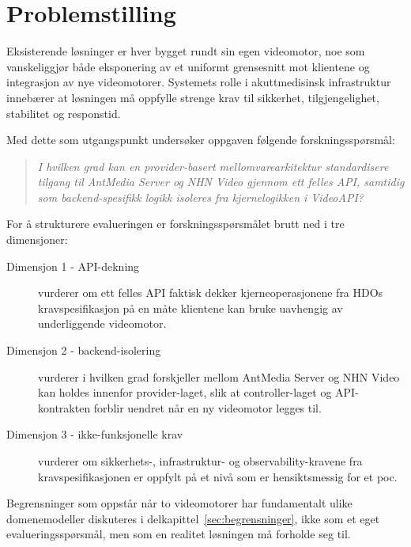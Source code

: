 \section{Problemstilling}
\label{sec:problemstilling}
Eksisterende løsninger er hver bygget rundt sin egen videomotor, noe som vanskeliggjør både eksponering av et uniformt grensesnitt mot klientene og integrasjon av nye videomotorer. Systemets rolle i akuttmedisinsk infrastruktur innebærer at løsningen må oppfylle strenge krav til sikkerhet, tilgjengelighet, stabilitet og responstid.


Med dette som utgangspunkt undersøker oppgaven følgende forskningsspørsmål:

\begin{quote}
\textit{I hvilken grad kan en \gls{provider-basert} mellomvarearkitektur standardisere tilgang til AntMedia Server og NHN Video gjennom ett felles API, samtidig som backend-spesifikk logikk isoleres fra kjernelogikken i VideoAPI?}
\end{quote}

For å strukturere evalueringen er forskningsspørsmålet brutt ned i tre dimensjoner:
\begin{description}
    \item[Dimensjon 1 - API-dekning]\label{dim:api-dekning} vurderer om ett felles API faktisk dekker kjerneoperasjonene fra HDOs kravspesifikasjon på en måte klientene kan bruke uavhengig av underliggende videomotor.
    \item[Dimensjon 2 - backend-isolering]\label{dim:backend-isolering} vurderer i hvilken grad forskjeller mellom AntMedia Server og NHN Video kan holdes innenfor \gls{provider-laget}, slik at \gls{controller-laget} og API-kontrakten forblir uendret når en ny videomotor legges til.
    \item[Dimensjon 3 - ikke-funksjonelle krav]\label{dim:nf-krav} vurderer om sikkerhets-, infrastruktur- og observability-kravene fra kravspesifikasjonen er oppfylt på et nivå som er hensiktsmessig for et \gls{poc}.
\end{description}


Begrensninger som oppstår når to videomotorer har fundamentalt ulike domenemodeller diskuteres i delkapittel~\ref{sec:begrensninger}, ikke som et eget evalueringsspørsmål, men som en realitet løsningen må forholde seg til.

